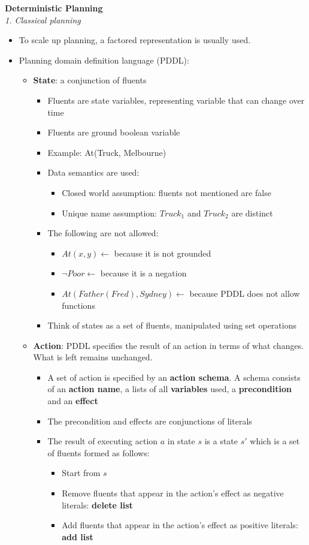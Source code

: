 \documentclass[12pt]{article}
\begin{document}
\noindent
{\large{ \textbf{Deterministic Planning} }}\\

\noindent
\textsl{1. Classical planning}
\begin{itemize}
\item To scale up planning, a factored representation is usually used. 
\item Planning domain definition language (PDDL):
\begin{itemize}
\item \textbf{State}: a conjunction of fluents
\begin{itemize}
\item Fluents are state variables, representing variable that can change over time
\item Fluents are ground boolean variable
\item Example: At(Truck, Melbourne)
\item Data semantics are used:
\begin{itemize}
\item Closed world assumption: fluents not mentioned are false
\item Unique name assumption: $Truck_1$ and $Truck_2$ are distinct
\end{itemize}
\item The following are not allowed:
\begin{itemize}
\item $At(x, y) \gets$ because it is not grounded
\item $\neg Poor \gets$ because it is a negation
\item $At(Father(Fred), Sydney) \gets$ because PDDL does not allow functions   
\end{itemize}
\item Think of states as a set of fluents, manipulated using set operations
\end{itemize}

\item \textbf{Action}: PDDL specifies the result of an action in terms of what changes. What is left remains unchanged.
\begin{itemize}
\item A set of action is specified by an \textbf{action schema}. A schema consists of an \textbf{action name}, a lists of all \textbf{ variables} used, a \textbf{precondition} and an \textbf{effect} 
\item The precondition and effects are conjunctions of literals 
\item The result of executing action $a$ in state $s$ is a state $s'$ which is a set of fluents formed as follows:
\begin{itemize}
\item Start from $s$
\item Remove fluents that appear in the action's effect as negative literals: \textbf{delete list}
\item Add fluents that appear in the action's effect as positive literals: \textbf{add list} \\


\end{itemize}
\end{itemize}
\end{itemize}
\end{itemize}
\end{document}
